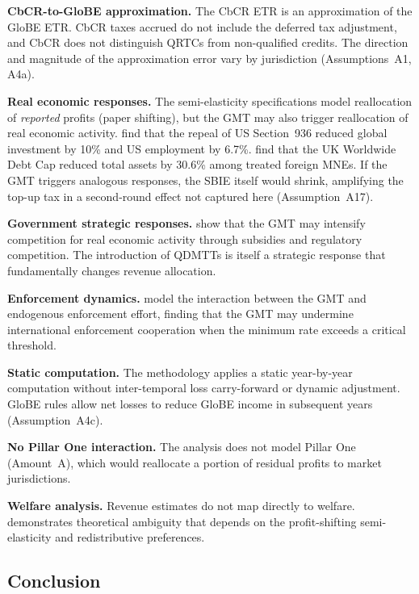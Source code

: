\documentclass[11pt,a4paper]{article}
\begin{document}
\textbf{CbCR-to-GloBE approximation.} The CbCR ETR is an approximation of the GloBE ETR. CbCR taxes accrued do not include the deferred tax adjustment, and CbCR does not distinguish QRTCs from non-qualified credits. The direction and magnitude of the approximation error vary by jurisdiction (Assumptions~A1, A4a).

\textbf{Real economic responses.} The semi-elasticity specifications model reallocation of \emph{reported} profits (paper shifting), but the GMT may also trigger reallocation of real economic activity. \citet{suarezserrato2018} find that the repeal of US Section~936 reduced global investment by 10\% and US employment by 6.7\%. \citet{bilicka2022} find that the UK Worldwide Debt Cap reduced total assets by 30.6\% among treated foreign MNEs. If the GMT triggers analogous responses, the SBIE itself would shrink, amplifying the top-up tax in a second-round effect not captured here (Assumption~A17).

\textbf{Government strategic responses.} \citet{janeba2023} show that the GMT may intensify competition for real economic activity through subsidies and regulatory competition. The introduction of QDMTTs is itself a strategic response that fundamentally changes revenue allocation.

\textbf{Enforcement dynamics.} \citet{jean2026} model the interaction between the GMT and endogenous enforcement effort, finding that the GMT may undermine international enforcement cooperation when the minimum rate exceeds a critical threshold.

\textbf{Static computation.} The methodology applies a static year-by-year computation without inter-temporal loss carry-forward or dynamic adjustment. GloBE rules allow net losses to reduce GloBE income in subsequent years (Assumption~A4c).

\textbf{No Pillar One interaction.} The analysis does not model Pillar One (Amount~A), which would reallocate a portion of residual profits to market jurisdictions.

\textbf{Welfare analysis.} Revenue estimates do not map directly to welfare. \citet{johannesen2022} demonstrates theoretical ambiguity that depends on the profit-shifting semi-elasticity and redistributive preferences.

\subsection{Conclusion}\label{sec:conclusion}
\end{document}
